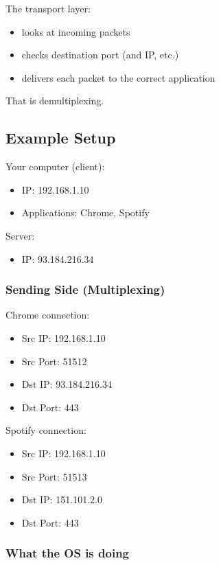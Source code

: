 The transport layer:
\begin{itemize}
    \item looks at incoming packets
    \item checks destination port (and IP, etc.)
    \item delivers each packet to the correct application
\end{itemize}

That is demultiplexing.

\subsection{Example Setup}

Your computer (client):
\begin{itemize}
    \item IP: 192.168.1.10
    \item Applications: Chrome, Spotify
\end{itemize}

Server:
\begin{itemize}
    \item IP: 93.184.216.34
\end{itemize}

\subsubsection{Sending Side (Multiplexing)}

Chrome connection:
\begin{itemize}
    \item Src IP: 192.168.1.10
    \item Src Port: 51512
    \item Dst IP: 93.184.216.34
    \item Dst Port: 443
\end{itemize}

Spotify connection:
\begin{itemize}
    \item Src IP: 192.168.1.10
    \item Src Port: 51513
    \item Dst IP: 151.101.2.0
    \item Dst Port: 443
\end{itemize}

\subsubsection{What the OS is doing}

